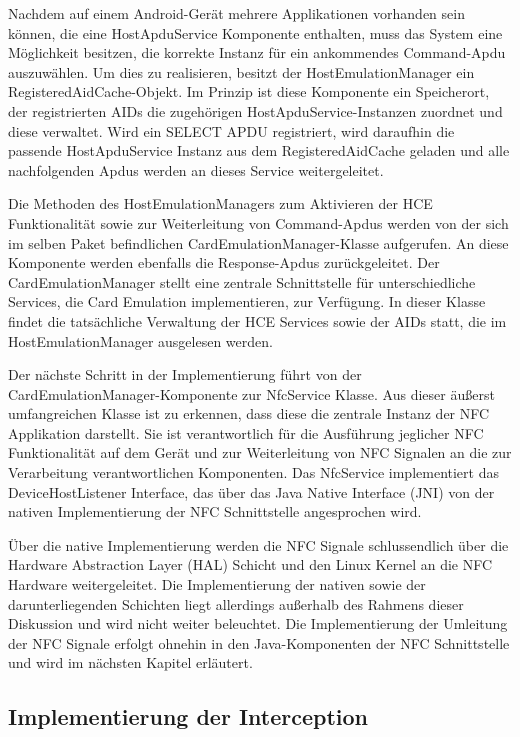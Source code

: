 Nachdem auf einem Android-Gerät mehrere Applikationen vorhanden sein können, die eine HostApduService Komponente enthalten, muss das System eine Möglichkeit besitzen, die korrekte Instanz für ein ankommendes Command-Apdu auszuwählen. Um dies zu realisieren, besitzt der HostEmulationManager ein RegisteredAidCache-Objekt. Im Prinzip ist diese Komponente ein Speicherort, der registrierten AIDs die zugehörigen HostApduService-Instanzen zuordnet und diese verwaltet. Wird ein SELECT APDU registriert, wird daraufhin die passende HostApduService Instanz aus dem RegisteredAidCache geladen und alle nachfolgenden Apdus werden an dieses Service weitergeleitet.

Die Methoden des HostEmulationManagers zum Aktivieren der HCE Funktionalität sowie zur Weiterleitung von Command-Apdus werden von der sich im selben Paket befindlichen CardEmulationManager-Klasse aufgerufen. An diese Komponente werden ebenfalls die Response-Apdus zurückgeleitet. Der CardEmulationManager stellt eine zentrale Schnittstelle für unterschiedliche Services, die Card Emulation implementieren, zur Verfügung. In dieser Klasse findet die tatsächliche Verwaltung der HCE Services sowie der AIDs statt, die im HostEmulationManager ausgelesen werden. 

Der nächste Schritt in der Implementierung führt von der CardEmulationManager-Komponente zur NfcService Klasse. Aus dieser äußerst umfangreichen Klasse ist zu erkennen, dass diese die zentrale Instanz der NFC Applikation darstellt. Sie ist verantwortlich für die Ausführung jeglicher NFC Funktionalität auf dem Gerät und zur Weiterleitung von NFC Signalen an die zur Verarbeitung verantwortlichen Komponenten. Das NfcService implementiert das DeviceHostListener Interface, das über das Java Native Interface (JNI) von der nativen Implementierung der NFC Schnittstelle angesprochen wird. 

Über die native Implementierung werden die NFC Signale schlussendlich über die Hardware Abstraction Layer (HAL) Schicht und den Linux Kernel an die NFC Hardware weitergeleitet. Die Implementierung der nativen sowie der darunterliegenden Schichten liegt allerdings außerhalb des Rahmens dieser Diskussion und wird nicht weiter beleuchtet.
Die Implementierung der Umleitung der NFC Signale erfolgt ohnehin in den Java-Komponenten der NFC Schnittstelle und wird im nächsten Kapitel erläutert. 

\subsection{Implementierung der Interception}


